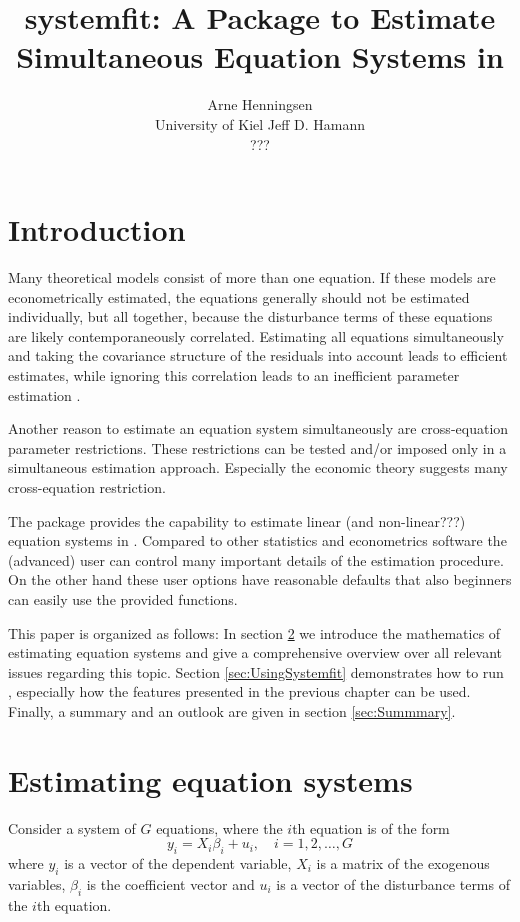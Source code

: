 \documentclass[article]{jss}
\author{Arne Henningsen\\University of Kiel\And 
        Jeff D. Hamann\\ ??? }
\title{systemfit: A Package to Estimate\\
       Simultaneous Equation Systems in \proglang{R}}
\begin{document}
\section{Introduction}

Many theoretical models consist of more than one equation.
If these models are econometrically estimated, 
the equations generally should not be estimated individually, 
but all together, because the disturbance terms of these 
equations are likely contemporaneously correlated.
Estimating all equations simultaneously and
taking the covariance structure of the residuals into account 
leads to efficient estimates, 
while ignoring this correlation leads to an inefficient 
parameter estimation \citep{zellner62}.

Another reason to estimate an equation system simultaneously are
cross-equation parameter restrictions. These restrictions can 
be tested and/or imposed only in a simultaneous estimation
approach. Especially the economic theory suggests many 
cross-equation restriction.

The  package provides the capability to estimate 
linear (and non-linear???) equation systems in .
Compared to other statistics and econometrics software 
the (advanced) user can control many important details of the 
estimation procedure. On the other hand these user options have
reasonable defaults that also beginners can easily use the
provided functions.

This paper is organized as follows: 
In section \ref{sec:Theory} we introduce the mathematics of estimating
equation systems and give a comprehensive overview over all
relevant issues regarding this topic.
Section \ref{sec:UsingSystemfit} demonstrates how to run ,
especially how the features presented in the previous chapter
can be used.
Finally, a summary and an outlook are given in section \ref{sec:Summmary}.


\section{Estimating equation systems}\label{sec:Theory}

Consider a system of $G$ equations, where the $i$th equation is of
the form 
\begin{equation}
   y_{i} = X_i \beta_i + u_i, \quad i = 1, 2, \ldots, G
\end{equation}
where $y_i$ is a vector of the dependent variable,
$X_i$ is a matrix of the exogenous variables,
$\beta_i$ is the coefficient vector and
$u_i$ is a vector of the disturbance terms of the $i$th equation.
\end{document}
